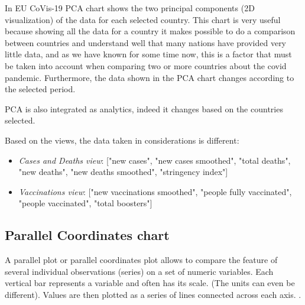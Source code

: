 \documentclass[10pt,conference]{IEEEtran}
\begin{document}
In EU CoVis-19 PCA chart shows the two principal components (2D visualization) of the data for each selected country. This chart is very useful because showing all the data for a country it makes possible to do a comparison between 
countries and understand well that many nations have provided very little data, and as we have known for some time now, this is a factor that must be taken into account when comparing two or more countries about the covid pandemic. 
Furthermore, the data shown in the PCA chart changes according to the selected period.

PCA is also integrated as analytics, indeed it changes based on the countries selected.

Based on the views, the data taken in considerations is different:
\begin{itemize}
 \item {\em Cases and Deaths view}: ["new cases", "new cases smoothed", "total deaths", "new deaths", "new deaths smoothed", "stringency index"]
 \item {\em Vaccinations view}: ["new vaccinations smoothed", "people fully vaccinated", "people vaccinated", "total boosters"]
\end{itemize}

\begin{figure}
\end{figure}

\subsection{Parallel Coordinates chart}
A parallel plot or parallel coordinates plot allows to compare the feature of several individual observations (series) on a set of numeric variables. Each vertical bar represents a variable and often has its scale. (The units can even be different). Values are then plotted as a series of lines connected across each axis. \cite{paral}.
\end{document}
